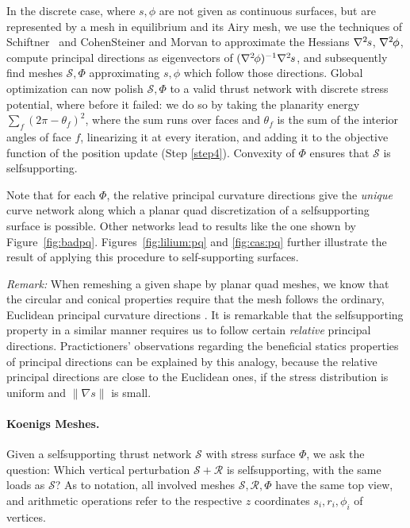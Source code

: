 \documentclass[review]{acmsiggraph}
\def\ess{s}
\def\Hess#1{{\def\testess{#1}\nabla^2\ifx\testess\ess\!s\else #1\fi}}
\def\Hess#1{\text{$\nabla^2\hskip-.2ex #1$}}
\def\SS{{\mathcal S}}
\def\RR{{\mathcal R}}
\begin{document}
In the discrete case, where $s,\phi$ are not given as continuous surfaces,
but are represented by a mesh in equilibrium and its Airy mesh, we use the
techniques of Schiftner~ and Cohen\dash Steiner
and Morvan  to approximate the Hessians
$\Hess s$, $\Hess\phi$, compute principal directions as eigenvectors of
$(\Hess\phi)^{-1}\Hess s$, and subsequently find meshes $\SS,\Phi$
approximating $s,\phi$ which follow those directions. Global optimization
can now polish $\SS,\Phi$ to a valid thrust network with discrete stress
potential, where before it failed: we do so by taking the planarity energy
$\sum_f (2\pi - \theta_f)^2$, where the sum runs over faces and $\theta_f$ is the
sum of the interior angles of face $f$, linearizing it at every iteration, and
adding it to the objective function of the position update (Step \ref{step4}).
Convexity of $\Phi$ ensures that $\SS$ is self\dash supporting.


Note that for each $\Phi$, the relative principal curvature directions give the
\emph{unique} curve network along which a planar quad discretization of a
self\dash supporting surface is possible. Other networks lead to results
like the one shown by Figure~\ref{fig:badpq}.
Figures~\ref{fig:lilium:pq} and \ref{fig:cas:pq}
further illustrate the result of applying this procedure to
self-supporting surfaces.




{\em Remark:} When remeshing a given shape by planar quad meshes, we know
that the circular and conical properties require that the mesh follows the
ordinary, Euclidean principal curvature directions \cite{Liu2006}. It is
remarkable that the self\dash supporting property in a similar manner
requires us to follow certain {\em relative} principal directions.
Practictioners' observations regarding the beneficial statics properties
of principal directions can be explained by this analogy, because the
relative principal directions are close to the Euclidean ones, if the
stress distribution is uniform and $\|\nabla s\|$ is small.



\paragraph{Koenigs Meshes.}

Given a self\dash supporting thrust network $\SS$ with stress surface
$\Phi$, we ask the question:
Which vertical perturbation $\SS+\RR$ is self\dash supporting, with the same
loads as $\SS$? As to notation, all involved meshes $\SS,\RR,\Phi$ have the
same top view, and arithmetic operations refer to the respective $z$
coordinates
$s_i,r_i,\phi_i$ of vertices.
\end{document}
